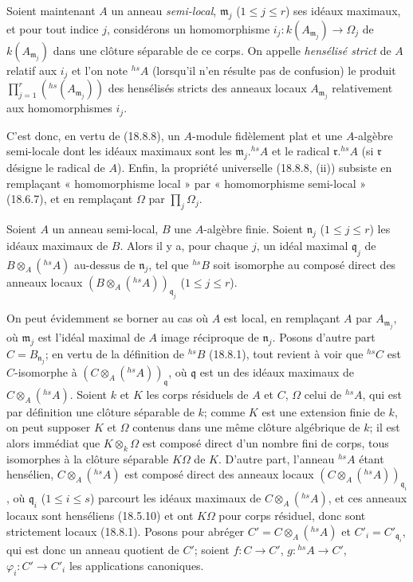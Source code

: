 \begin{env}[18.8.9]
\label{IV.18.8.9}
Soient maintenant $A$ un anneau \emph{semi-local}, $\mathfrak m_j$ ($1\leq j\leq r$) ses idéaux maximaux, et pour tout indice $j$, considérons un homomorphisme $i_j:k(A_{\mathfrak m_j})\to\Omega_j$ de $k(A_{\mathfrak m_j})$ dans une clôture séparable de ce corps. On appelle \emph{hensélisé strict} de $A$ relatif aux $i_j$ et l'on note ${}^{hs}\!A$ (lorsqu'il n'en résulte pas de confusion) le produit $\prod_{j=1}^r({}^{hs}(A_{\mathfrak m_j}))$ des hensélisés stricts des anneaux locaux $A_{\mathfrak m_j}$ relativement aux homomorphismes $i_j$.


C'est donc, en vertu de (18.8.8), un $A$-module fidèlement plat et une $A$-algèbre semi-locale dont les idéaux maximaux sont les $\mathfrak m_j.{}^{hs}\!A$ et le radical $\mathfrak r.{}^{hs}\!A$ (si $\mathfrak r$ désigne le radical de $A$). Enfin, la propriété universelle (18.8.8, (ii)) subsiste en remplaçant « homomorphisme local » par « homomorphisme semi-local » (18.6.7), et en remplaçant $\Omega$ par $\prod_j\Omega_j$.
\end{env}

\begin{proposition}[18.8.10]
\label{IV.18.8.10}
Soient $A$ un anneau semi-local, $B$ une $A$-algèbre finie. Soient $\mathfrak n_j$ ($1\leq j\leq r$) les idéaux maximaux de $B$. Alors il y a, pour chaque $j$, un idéal maximal $\mathfrak q_j$ de $B\otimes_A({}^{hs}\!A)$ au-dessus de $\mathfrak n_j$, tel que ${}^{hs}\!B$ soit isomorphe au composé direct des anneaux locaux $(B\otimes_A({}^{hs}\!A))_{\mathfrak q_j}$ ($1\leq j\leq r$).
\end{proposition}

On peut évidemment se borner au cas où $A$ est local, en remplaçant $A$ par $A_{\mathfrak m_j}$, où $\mathfrak m_j$ est l'idéal maximal de $A$ image réciproque de $\mathfrak n_j$. Posons d'autre part $C=B_{\mathfrak n_j}$; en vertu de la définition de ${}^{hs}\!B$ (18.8.1), tout revient à voir que ${}^{hs}\!C$ est $C$-isomorphe à $(C\otimes_A({}^{hs}\!A))_{\mathfrak q}$, où $\mathfrak q$ est un des idéaux maximaux de $C\otimes_A({}^{hs}\!A)$. Soient $k$ et $K$ les corps résiduels de $A$ et $C$, $\Omega$ celui de ${}^{hs}\!A$, qui est par définition une clôture séparable de $k$; comme $K$ est une extension finie de $k$, on peut supposer $K$ et $\Omega$ contenus dans une même clôture algébrique de $k$; il est alors immédiat que $K\otimes_k\Omega$ est composé direct d'un nombre fini de corps, tous isomorphes à la clôture séparable $K\Omega$ de $K$. D'autre part, l'anneau ${}^{hs}\!A$ étant hensélien, $C\otimes_A({}^{hs}\!A)$ est composé direct des anneaux locaux $(C\otimes_A({}^{hs}\!A))_{\mathfrak q_i}$, où $\mathfrak q_i$ ($1\leq i\leq s$) parcourt les idéaux maximaux de $C\otimes_A({}^{hs}\!A)$, et ces anneaux locaux sont henséliens (18.5.10) et ont $K\Omega$ pour corps résiduel, donc sont strictement locaux (18.8.1). Posons pour abréger $C'=C\otimes_A({}^{hs}\!A)$ et $C'_i=C'_{\mathfrak q_i}$, qui est donc un anneau quotient de $C'$; soient $f:C\to C'$, $g:{}^{hs}\!A\to C'$, $\varphi_i:C'\to C'_i$ les applications canoniques.

